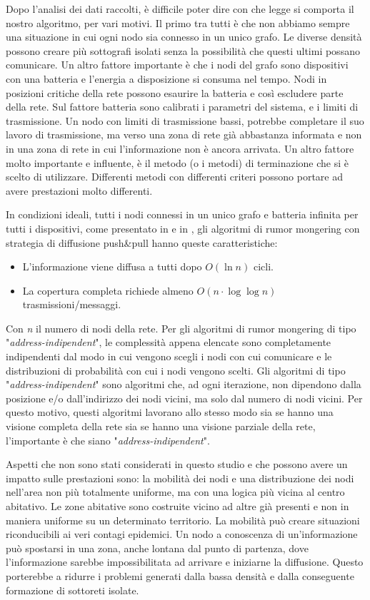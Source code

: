 Dopo l'analisi dei dati raccolti, è difficile poter dire con che legge si comporta il nostro algoritmo, per vari motivi. Il primo tra tutti è che non abbiamo sempre una situazione in cui ogni nodo sia connesso in un unico grafo. Le diverse densità possono creare più sottografi isolati senza la possibilità che questi ultimi possano comunicare. Un altro fattore importante è che i nodi del grafo sono dispositivi con una batteria e l'energia a disposizione si consuma nel tempo. Nodi in posizioni critiche della rete possono esaurire la batteria e così escludere parte della rete. Sul fattore batteria sono calibrati i parametri del sistema, e i limiti di trasmissione. Un nodo con limiti di trasmissione bassi, potrebbe completare il suo lavoro di trasmissione, ma verso una zona di rete già abbastanza informata e non in una zona di rete in cui l'informazione non è ancora arrivata. Un altro fattore molto importante e influente, è il metodo (o i metodi) di terminazione che si è scelto di utilizzare. Differenti metodi con differenti criteri possono portare ad avere prestazioni molto differenti.

In condizioni ideali, tutti i nodi connessi in un unico grafo e batteria infinita per tutti i dispositivi, come presentato in \cite{gossip2000-comp} e in \cite{schindel2004-epidemicAlg}, gli algoritmi di rumor mongering con strategia di diffusione push\&pull hanno queste caratteristiche:
\begin{itemize}
	\item L'informazione viene diffusa a tutti dopo $ O\left( \ln \mathit{n} \right)  $ cicli.
	\item La copertura completa richiede almeno $ O\left( \mathit{n}\cdot\log \log \mathit{n} \right)  $ trasmissioni/messaggi.
\end{itemize}
Con \textit{n} il numero di nodi della rete. Per gli algoritmi di rumor mongering di tipo "\textit{address-indipendent}", le complessità appena elencate sono completamente indipendenti dal modo in cui vengono scegli i nodi con cui comunicare e le distribuzioni di probabilità con cui i nodi vengono scelti. Gli algoritmi di tipo "\textit{address-indipendent}" sono algoritmi che, ad ogni iterazione, non dipendono dalla posizione e/o dall'indirizzo dei nodi vicini, ma solo dal numero di nodi vicini. Per questo motivo, questi algoritmi lavorano allo stesso modo sia se hanno una visione completa della rete sia se hanno una visione parziale della rete, l'importante è che siano "\textit{address-indipendent}".

Aspetti che non sono stati considerati in questo studio e che possono avere un impatto sulle prestazioni sono: la mobilità dei nodi e una distribuzione dei nodi nell'area non più totalmente uniforme, ma con una logica più vicina al centro abitativo. Le zone abitative sono costruite vicino ad altre già presenti e non in maniera uniforme su un determinato territorio. La mobilità può creare situazioni riconducibili ai veri contagi epidemici. Un nodo a conoscenza di un'informazione può spostarsi in una zona, anche lontana dal punto di partenza, dove l'informazione sarebbe impossibilitata ad arrivare e iniziarne la diffusione. Questo porterebbe a ridurre i problemi generati dalla bassa densità e dalla conseguente formazione di sottoreti isolate.